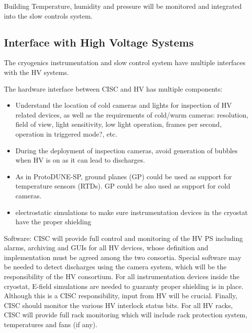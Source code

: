Building Temperature, humidity and pressure will be monitored and integrated into the slow controls system. 

\subsection{Interface with High Voltage Systems}
\label{sec:fdsp-slow-cryo-slow-hv}


The cryogenics instrumentation and slow control system have multiple interfaces with the HV systems. 

The hardware interface between CISC and HV has multiple components: 
\begin{itemize}
\item Understand the location of cold cameras and lights for inspection of HV related devices, as well as the requirements
  of cold/warm cameras: resolution, field of view, light sensitivity, low light operation, frames per second, operation in triggered mode?,  etc. 
\item During the deployment of inspection cameras, avoid generation of bubbles when HV is on as it can lead to discharges.
\item As in ProtoDUNE-SP, ground planes (GP) could be used as support for temperature sensors (RTDs). GP could be also used as support for cold cameras. 
\item electrostatic simulations to make sure instrumentation devices in the cryostat have the proper shielding 
\end{itemize}



Software: CISC will provide full control and monitoring of the HV PS including alarms, archiving and GUIs for all HV devices,
whose definition and implementation must be agreed among the two consortia. Special software may be needed to detect discharges
using the camera system, which will be the responsibility of the HV consortium. For all instrumentation devices inside the cryostat,
E-field simulations are needed to guaranty proper shielding is in place. Although this is a CISC responsibility, input from HV will be crucial.
Finally, CISC should monitor the various HV interlock status bits. For all HV racks, CISC will provide full rack monitoring which will include
rack protection system, temperatures and fans (if any).



